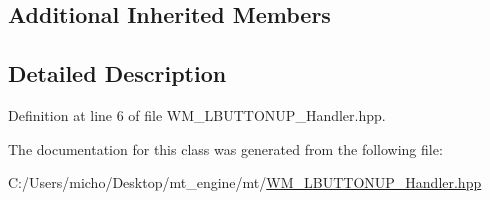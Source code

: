 \subsection*{Additional Inherited Members}


\subsection{Detailed Description}


Definition at line 6 of file W\+M\+\_\+\+L\+B\+U\+T\+T\+O\+N\+U\+P\+\_\+\+Handler.\+hpp.



The documentation for this class was generated from the following file\+:\begin{DoxyCompactItemize}
\item 
C\+:/\+Users/micho/\+Desktop/mt\+\_\+engine/mt/\hyperlink{_w_m___l_b_u_t_t_o_n_u_p___handler_8hpp}{W\+M\+\_\+\+L\+B\+U\+T\+T\+O\+N\+U\+P\+\_\+\+Handler.\+hpp}\end{DoxyCompactItemize}
